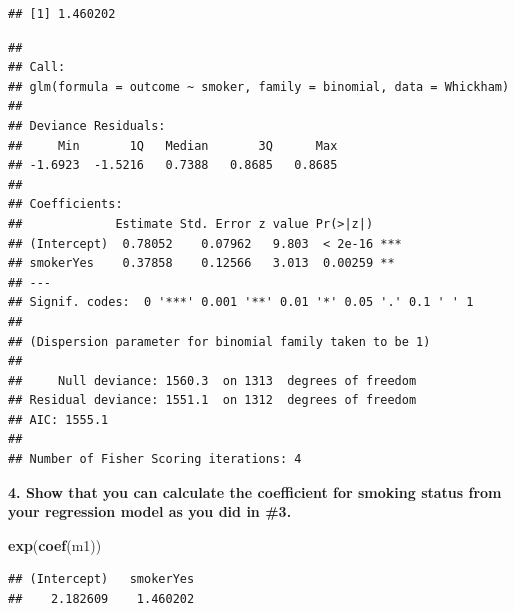 \documentclass[]{article}
\newenvironment{Shaded}{\begin{snugshade}}{\end{snugshade}}
\newcommand{\DataTypeTok}[1]{\textcolor[rgb]{0.13,0.29,0.53}{#1}}
\newcommand{\KeywordTok}[1]{\textcolor[rgb]{0.13,0.29,0.53}{\textbf{#1}}}
\newcommand{\NormalTok}[1]{#1}
\newcommand{\OperatorTok}[1]{\textcolor[rgb]{0.81,0.36,0.00}{\textbf{#1}}}
\newcommand{\StringTok}[1]{\textcolor[rgb]{0.31,0.60,0.02}{#1}}
\begin{document}
\begin{verbatim}
## [1] 1.460202
\end{verbatim}

\begin{Shaded}
\end{Shaded}

\begin{verbatim}
## 
## Call:
## glm(formula = outcome ~ smoker, family = binomial, data = Whickham)
## 
## Deviance Residuals: 
##     Min       1Q   Median       3Q      Max  
## -1.6923  -1.5216   0.7388   0.8685   0.8685  
## 
## Coefficients:
##             Estimate Std. Error z value Pr(>|z|)    
## (Intercept)  0.78052    0.07962   9.803  < 2e-16 ***
## smokerYes    0.37858    0.12566   3.013  0.00259 ** 
## ---
## Signif. codes:  0 '***' 0.001 '**' 0.01 '*' 0.05 '.' 0.1 ' ' 1
## 
## (Dispersion parameter for binomial family taken to be 1)
## 
##     Null deviance: 1560.3  on 1313  degrees of freedom
## Residual deviance: 1551.1  on 1312  degrees of freedom
## AIC: 1555.1
## 
## Number of Fisher Scoring iterations: 4
\end{verbatim}

\vspace{0.25in}

\textbf{4. Show that you can calculate the coefficient for smoking
status from your regression model as you did in \#3.}

\begin{Shaded}
\begin{Highlighting}[]
\KeywordTok{exp}\NormalTok{(}\KeywordTok{coef}\NormalTok{(m1))}
\end{Highlighting}
\end{Shaded}

\begin{verbatim}
## (Intercept)   smokerYes 
##    2.182609    1.460202
\end{verbatim}
\end{document}
